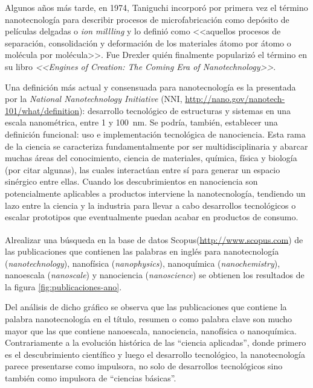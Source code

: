 	 Algunos años más tarde, en 1974, Taniguchi incorporó por primera vez el término nanotecnología para describir procesos de microfabricación como depósito de películas delgadas o \textit{ion millling} y lo definió como <<aquellos procesos de separación, consolidación y deformación de los materiales átomo por átomo o molécula por molécula>>. \cite{taniguchi1974} Fue Drexler quién finalmente popularizó el término en su libro \textit{<<Engines of Creation: The Coming Era of Nanotechnology>>}\cite{drexler1987}. 

	 Una definición más actual y consensuada para nanotecnología es la presentada por la \textit{National Nanotechnology Initiative} (NNI, \url{http://nano.gov/nanotech-101/what/definition}): desarrollo tecnológico de estructuras y sistemas en una escala nanométrica, entre 1 y \SI{100}{\nm}. Se podría, también, establecer una definición funcional: uso e implementación tecnológica de nanociencia. Esta rama de la ciencia se caracteriza fundamentalmente por ser multidisciplinaria y abarcar muchas áreas del conocimiento, ciencia de materiales, química, física y biología (por citar algunas), las cuales interactúan entre sí para generar un espacio sinérgico entre ellas. Cuando los descubrimientos en nanociencia son potencialmente aplicables a productos interviene la nanotecnología, tendiendo un lazo entre la ciencia y la industria para llevar a cabo desarrollos tecnológicos o escalar prototipos que eventualmente puedan acabar en productos de consumo.
	
	 Al\space realizar una búsqueda en la base de datos Scopus\textsuperscript\textregistered (\url{http://www.scopus.com}) de las publicaciones que contienen las palabras en inglés para nanotecnología (\textit{nanotechnology}), nanofísica (\textit{nanophysics}), nanoquímica (\textit{nanochemistry}), nanoescala (\textit{nanoscale}) y nanociencia (\textit{nanoscience}) se obtienen los resultados de la figura \ref{fig:publicaciones-ano}. 

	 Del análisis de dicho gráfico se observa que las publicaciones que contiene la palabra nanotecnología en el título, resumen o como palabra clave son mucho mayor que las que contiene nanoescala, nanociencia, nanofísica o nanoquímica. Contrariamente a la evolución histórica de las ``ciencia aplicadas'', donde primero es el descubrimiento científico y luego el desarrollo tecnológico, la nanotecnología parece presentarse como impulsora, no solo de desarrollos tecnológicos sino también como impulsora de ``ciencias básicas''.

